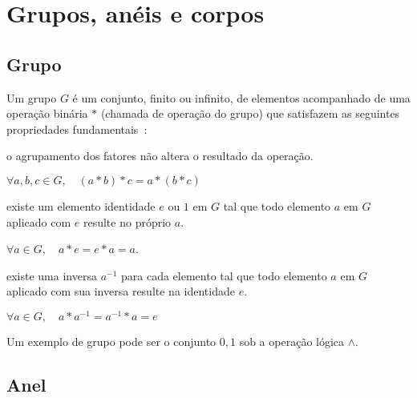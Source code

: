 \documentclass[12pt]{article}
\begin{document}
\section{Grupos, anéis e corpos}

\subsection{Grupo}

Um grupo $G$ é um conjunto, finito ou infinito, de elementos acompanhado de uma
operação binária $*$ (chamada de operação do grupo) que satisfazem as seguintes
propriedades fundamentais~\cite{weisstein:1999:group}:

\begin{description}
    \setlength\itemsep{1em}

    \item[Associatividade:] o agrupamento dos fatores não altera o resultado da
        operação.
        \newline
        \begin{center}
            $\forall a, b, c \in G, \quad (a*b)*c = a*(b*c)$
        \end{center}

    \item[Identidade:] existe um elemento identidade $e$ ou $1$ em $G$ tal que
        todo elemento $a$ em $G$ aplicado com $e$ resulte no próprio $a$.
        \newline
        \begin{center}
            $\forall a \in G, \quad a*e = e*a = a$.
        \end{center}

    \item[Inversa:] existe uma inversa $a^{-1}$ para cada elemento tal que todo
        elemento $a$ em $G$ aplicado com sua inversa resulte na identidade $e$.
        \newline
        \begin{center}
            $\forall a \in G, \quad a*a^{-1} = a^{-1}*a = e$
        \end{center}

\end{description}

Um exemplo de grupo pode ser o conjunto ${0, 1}$ sob a operação lógica $\land$.

\subsection{Anel}
\end{document}
